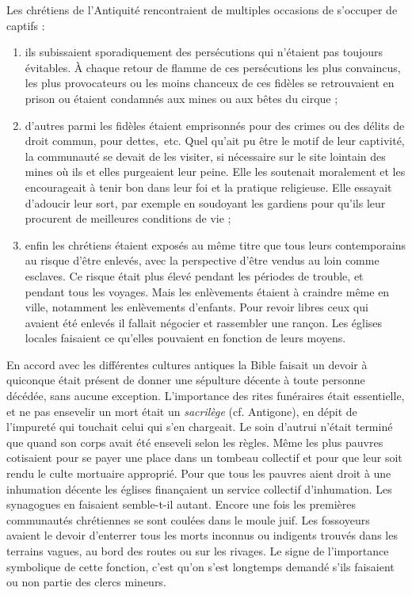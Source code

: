 Les chrétiens de l'Antiquité rencontraient de multiples occasions de s'occuper de captifs :
\begin{enumerate}
\item ils subissaient sporadiquement des persécutions qui n'étaient pas toujours évitables. À chaque retour de flamme de ces persécutions les plus convaincus, les plus provocateurs ou les moins chanceux de ces fidèles se retrouvaient en prison ou étaient condamnés aux mines ou aux bêtes du cirque ;
\item d'autres parmi les fidèles étaient emprisonnés pour des crimes ou des délits de droit commun, pour dettes,~etc. Quel qu'ait pu être le motif de leur captivité, la communauté se devait de les visiter, si nécessaire sur le site lointain des mines où ils et elles purgeaient leur peine. Elle les soutenait moralement et les encourageait à tenir bon dans leur foi et la pratique religieuse. Elle essayait d'adoucir leur sort, par exemple en soudoyant les gardiens pour qu'ils leur procurent de meilleures conditions de vie ;
\item enfin les chrétiens étaient exposés au même titre que tous leurs contemporains au risque d'être enlevés, avec la perspective d'être vendus au loin comme esclaves. Ce risque était plus élevé pendant les périodes de trouble, et pendant tous les voyages. Mais les enlèvements étaient à craindre même en ville, notamment les enlèvements d'enfants. Pour revoir libres ceux qui avaient été enlevés il fallait négocier et rassembler une rançon. Les églises locales faisaient ce qu'elles pouvaient en fonction de leurs moyens. 
\end{enumerate}



En accord avec les différentes cultures antiques la Bible faisait un devoir à quiconque était présent de donner une sépulture décente à toute personne décédée, sans aucune exception. L'importance des rites funéraires
 était essentielle, et ne pas ensevelir un mort était un \emph{sacrilège} (cf. Antigone), en dépit de l'impureté qui touchait celui qui s'en chargeait. Le soin d'autrui n'était terminé que quand son corps avait été enseveli selon les règles. Même les plus pauvres cotisaient pour se payer une place dans un tombeau collectif et pour que leur soit rendu le culte mortuaire approprié. 
 Pour que tous les pauvres aient droit à une inhumation décente les églises finançaient un service collectif d'inhumation. Les synagogues en faisaient semble-t-il autant. Encore une fois les premières communautés chrétiennes se sont coulées dans le moule juif. Les fossoyeurs avaient le devoir d'enterrer tous les morts inconnus ou indigents trouvés dans les terrains vagues, au bord des routes ou sur les rivages. Le signe de l'importance symbolique de cette fonction, c'est qu'on s'est longtemps demandé s'ils faisaient ou non partie des clercs mineurs. 



